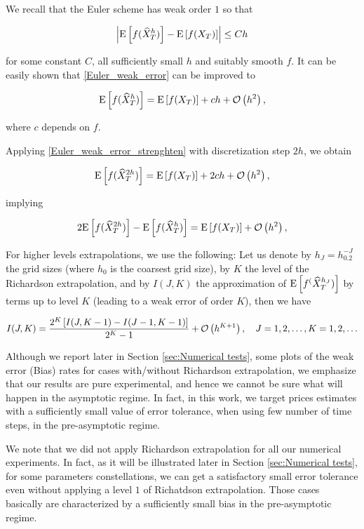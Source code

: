 We  recall that the Euler scheme has weak order $1$ so that

\begin{align}\label{Euler_weak_error}
	\left\lvert\mathrm{E}\left[f(\widehat{X}_T^h)\right]-\mathrm{E}\left[f(X_T)\right] \right\rvert  \leq C h
\end{align}

for some constant $C$, all sufficiently small $h$ and suitably smooth $f$. It can be easily  shown that  \eqref{Euler_weak_error} can be improved to


\begin{align}\label{Euler_weak_error_strenghten}
	\mathrm{E}\left[f(\widehat{X}_T^h)\right]= \mathrm{E}\left[f(X_T)\right] + c h +{\mathcal{O}}\left(h^2\right) ,
\end{align}


where $c$ depends on $f$. 

Applying \eqref{Euler_weak_error_strenghten} with discretization step $2h$, we  obtain

\begin{align}\label{Euler_weak_error_strenghten_2h}
	\mathrm{E}\left[f(\widehat{X}_T^{2h})\right]= \mathrm{E}\left[f(X_T)\right] + 2 c h +{\mathcal{O}}\left(h^2\right) ,
\end{align}

implying

\begin{align}\label{Richardson_extrapol}
	2 \mathrm{E}\left[f(\widehat{X}_T^{2h})\right]- \mathrm{E}\left[f(\widehat{X}_T^{h})\right] =\mathrm{E}\left[f(X_T)\right] + {\mathcal{O}}\left(h^2\right) ,
\end{align}

For higher levels extrapolations, we use the following: Let us denote by $h_J=h_0.2^{-J}$ the grid sizes (where $h_0$ is the coarsest grid size), by $K$ the level of the Richardson extrapolation, and by $I(J,K)$ the approximation of $\mathrm{E}\left[f^(\widehat{X}_T^{h_J})\right]$ by terms up to level $K$ (leading to a weak error of order $K$), then we have

\begin{align}
I(J,K)=\frac{2^K\left[I(J,K-1)-I(J-1,K-1)\right]}{2^K-1} +{\mathcal{O}}\left(h^{K+1}\right),\quad J=1,2,\dots, K=1,2,\dots
\end{align}


\begin{remark}
	Although we report later in Section \ref{sec:Numerical tests}, some plots of the weak error (Bias) rates for cases with/without Richardson extrapolation, we emphasize that our results are pure experimental, and hence we cannot be sure what will happen in the asymptotic regime. In fact, in this work, we target prices estimates with a sufficiently small value  of error tolerance,  when using few number of time steps, \ie  in the pre-asymptotic regime.
\end{remark}
\begin{remark}
	We note that we did not apply Richardson extrapolation for all our numerical experiments. In fact, as it will be illustrated later in Section \ref{sec:Numerical tests}, for some parameters constellations, we can get a satisfactory small error tolerance even without applying a level $1$ of Richatdson extrapolation. Those cases basically are characterized by a sufficiently small bias in the pre-asymptotic regime.	
\end{remark}



